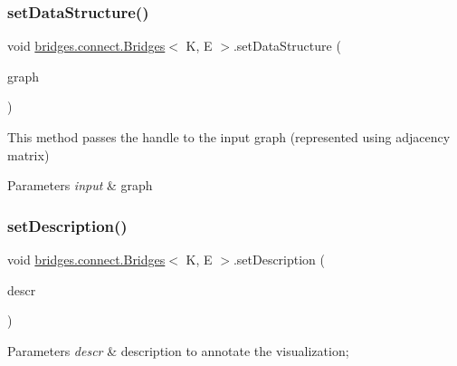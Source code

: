 \subsubsection{\texorpdfstring{set\+Data\+Structure()}{setDataStructure()}\hspace{0.1cm}{\footnotesize\ttfamily [12/12]}}
{\footnotesize\ttfamily void \hyperlink{classbridges_1_1connect_1_1_bridges}{bridges.\+connect.\+Bridges}$<$ K, E $>$.set\+Data\+Structure (\begin{DoxyParamCaption}\item[{\hyperlink{classbridges_1_1base_1_1_graph_adj_matrix}{Graph\+Adj\+Matrix}$<$ K, E $>$}]{graph }\end{DoxyParamCaption})}

This method passes the handle to the input graph (represented using adjacency matrix)


\begin{DoxyParams}{Parameters}
{\em input} & graph \\
\hline
\end{DoxyParams}
\hypertarget{classbridges_1_1connect_1_1_bridges_a161206b37c2acdf435f4444679616eec}{}\label{classbridges_1_1connect_1_1_bridges_a161206b37c2acdf435f4444679616eec} 
\subsubsection{\texorpdfstring{set\+Description()}{setDescription()}}
{\footnotesize\ttfamily void \hyperlink{classbridges_1_1connect_1_1_bridges}{bridges.\+connect.\+Bridges}$<$ K, E $>$.set\+Description (\begin{DoxyParamCaption}\item[{String}]{descr }\end{DoxyParamCaption})}


\begin{DoxyParams}{Parameters}
{\em descr} & description to annotate the visualization; \\
\hline
\end{DoxyParams}
\hypertarget{classbridges_1_1connect_1_1_bridges_a484992ce3fce273ca2caa215a4488e3c}{}\label{classbridges_1_1connect_1_1_bridges_a484992ce3fce273ca2caa215a4488e3c} 

